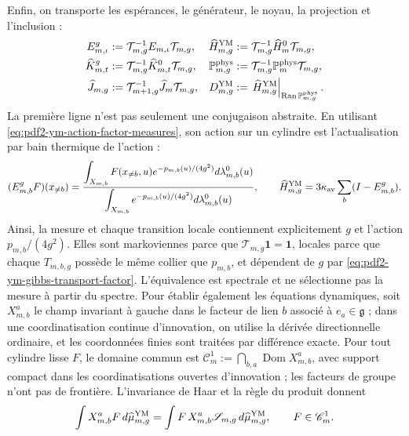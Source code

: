 Enfin, on transporte les espérances, le générateur, le noyau, la projection et l’inclusion :
\begin{equation}\label{eq:pdf2-ym-g-dynamics}
 \begin{aligned}
 E_{m,\iota}^{g}&:=\mathcal T_{m,g}^{-1}E_{m,\iota}\mathcal T_{m,g},&
 \widehat H_{m,g}^{\rm YM}&:=\mathcal T_{m,g}^{-1}\widehat H_m^0\mathcal T_{m,g},\\
 \widehat K_{m,t}^{g}&:=\mathcal T_{m,g}^{-1}\widehat K_{m,t}^{0}\mathcal T_{m,g},&
 \mathbb P_{m,g}^{\rm phys}&:=\mathcal T_{m,g}^{-1}
     \mathbb P_m^{\rm phys}\mathcal T_{m,g},\\
 \widehat J_{m,g}&:=\mathcal T_{m+1,g}^{-1}
     \widehat J_m\mathcal T_{m,g},&
 D_{m,g}^{\rm YM}&:=\left.\widehat H_{m,g}^{\rm YM}
     \right|_{\operatorname{Ran}\mathbb P_{m,g}^{\rm phys}}.
 \end{aligned}
\end{equation}
La première ligne n’est pas seulement une conjugaison abstraite. En utilisant
\eqref{eq:pdf2-ym-action-factor-measures}, son action sur un cylindre est
l’actualisation par bain thermique de l’action :
\begin{equation}\label{eq:pdf2-ym-gibbs-conditional-expectation}
 (E_{m,b}^{g}F)(x_{\ne b})
 =\frac{\displaystyle
   \int_{X_{m,b}}F(x_{\ne b},u)e^{-p_{m,b}(u)/(4g^2)}
       d\lambda_{m,b}^0(u)}{\displaystyle
   \int_{X_{m,b}}e^{-p_{m,b}(u)/(4g^2)}d\lambda_{m,b}^0(u)},
 \qquad
 \widehat H_{m,g}^{\rm YM}
 =3\kappa_{\rm av}\sum_b(I-E_{m,b}^{g}).
\end{equation}
Ainsi, la mesure et chaque transition locale contiennent explicitement $g$ et l'action $p_{m,b}/(4g^2)$. Elles sont markoviennes parce que $\mathcal T_{m,g}\mathbf1=\mathbf1$, locales parce que chaque $T_{m,b,g}$ possède le même collier que $p_{m,b}$, et dépendent de $g$ par \eqref{eq:pdf2-ym-gibbs-transport-factor}. L'équivalence est spectrale et ne sélectionne pas la mesure à partir du spectre. Pour établir également les équations dynamiques, soit $X_{m,b}^a$ le champ invariant à gauche dans le facteur de lien $b$ associé à $e_a\in\mathfrak g$ ; dans une coordinatisation continue d'innovation, on utilise la dérivée directionnelle ordinaire, et les coordonnées finies sont traitées par différence exacte. Pour tout cylindre lisse $F$, le domaine commun est $\mathscr C_m^1:=\bigcap_{b,a}\operatorname{Dom}X_{m,b}^a$, avec support compact dans les coordinatisations ouvertes d'innovation ; les facteurs de groupe n'ont pas de frontière. L'invariance de Haar et la règle du produit donnent
\begin{equation}\label{eq:pdf2-ym-schwinger-dyson-finite}
 \int X_{m,b}^aF\,d\widehat\mu_{m,g}^{\rm YM}
 =\int F\,X_{m,b}^a\mathscr S_{m,g}\,d\widehat\mu_{m,g}^{\rm YM},
 \qquad F\in\mathscr C_m^1.
\end{equation}
